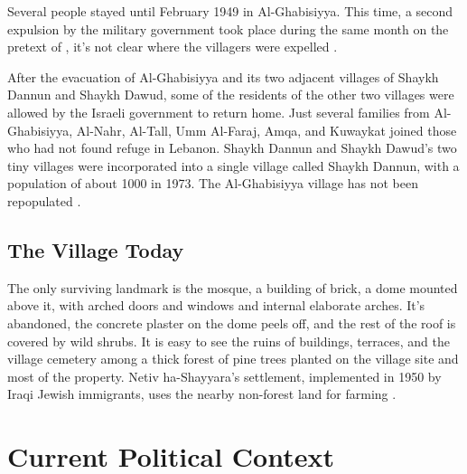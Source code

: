 Several people stayed until February 1949 in Al-Ghabisiyya. This time, a second expulsion by the military government took place during the same month on the pretext of , it's not clear where the villagers were expelled \citep{Morris2004}.

After the evacuation of Al-Ghabisiyya and its two adjacent villages of Shaykh Dannun and Shaykh Dawud, some of the residents of the other two villages were allowed by the Israeli government to return home. Just several families from Al-Ghabisiyya, Al-Nahr, Al-Tall, Umm Al-Faraj, Amqa, and Kuwaykat joined those who had not found refuge in Lebanon. Shaykh Dannun and Shaykh Dawud's two tiny villages were incorporated into a single village called Shaykh Dannun, with a population of about 1000 in 1973. The Al-Ghabisiyya village has not been repopulated \citep{Khalidi2015}.  

\subsection{The Village Today}

The only surviving landmark is the mosque, a building of brick, a dome mounted above it, with arched doors and windows and internal elaborate arches. It's abandoned, the concrete plaster on the dome peels off, and the rest of the roof is covered by wild shrubs. It is easy to see the ruins of buildings, terraces, and the village cemetery among a thick forest of pine trees planted on the village site and most of the property. Netiv ha-Shayyara's settlement, implemented in 1950 by Iraqi Jewish immigrants, uses the nearby non-forest land for farming \citep{Khalidi2015}.    
\section{Current Political Context}

